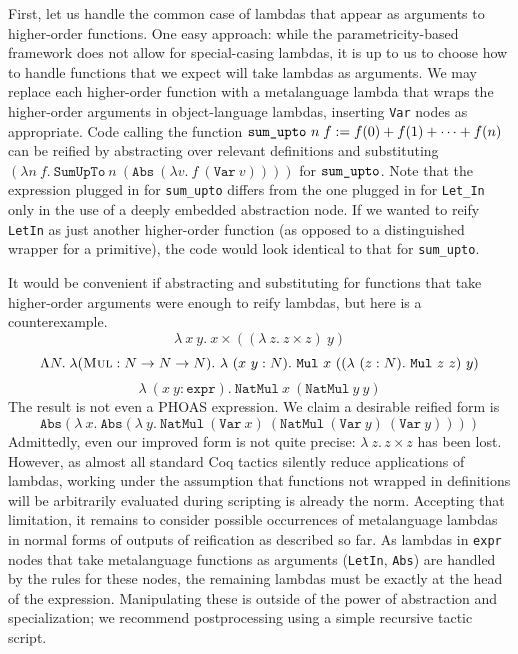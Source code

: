 First, let us handle the common case of lambdas that appear as arguments to higher-order functions.
One easy approach: while the parametricity-based framework does not allow for special-casing lambdas, it is up to us to choose how to handle functions that we expect will take lambdas as arguments.
We may replace each higher-order function with a metalanguage lambda that wraps the higher-order arguments in object-language lambdas, inserting \texttt{Var} nodes as appropriate.
Code calling the function $\text{\texttt{sum\_upto} }n\; f := f(0) + f(1) + \cdots + f(n)$ can be reified by abstracting over relevant definitions and substituting
$(\lambda n\ f.\ \texttt{SumUpTo}\ n\ (\texttt{Abs}\ (\lambda v.\ f\ (\texttt{Var}\ v))))$ for $\text{\texttt{sum\_upto}}$.
Note that the expression plugged in for \texttt{sum\_upto} differs from the one plugged in for \texttt{Let\_In} only in the use of a deeply embedded abstraction node.
If we wanted to reify \texttt{LetIn} as just another higher-order function (as opposed to a distinguished wrapper for a primitive), the code would look identical to that for \texttt{sum\_upto}.

It would be convenient if abstracting and substituting for functions that take higher-order arguments were enough to reify lambdas, but here is a counterexample.
\[
  \lambda\ x\ y.\ x \times ((\lambda\ z.\ z \times z)\ y)
\]
\[
  \Lambda N. \; \lambda (\textsc{Mul} : N \to N \to N).\ \lambda\ (x\ y : N).\ \texttt{Mul}\ x\ ((\lambda\ (z : N).\ \texttt{Mul}\ z\  z)\ y)
\]
\[
  \lambda\ (x\ y : \texttt{expr}).\ \texttt{NatMul}\ x\ (\texttt{NatMul}\ y\  y)
\]
The result is not even a PHOAS expression. We claim a desirable reified form is
\[
  \texttt{Abs}(\lambda\ x.\ \texttt{Abs}(\lambda\ y.\ \texttt{NatMul}\ (\texttt{Var}\ x)\ (\texttt{NatMul}\ (\texttt{Var}\ y)\  (\texttt{Var}\ y))))
\]
Admittedly, even our improved form is not quite precise: $\lambda\ z.\, z \times z$ has been lost. However, as almost all standard Coq tactics silently reduce applications of lambdas, working under the assumption that functions not wrapped in definitions will be arbitrarily evaluated during scripting is already the norm.
Accepting that limitation, it remains to consider possible occurrences of metalanguage lambdas in normal forms of outputs of reification as described so far.
As lambdas in \texttt{expr} nodes that take metalanguage functions as arguments (\texttt{LetIn}, \texttt{Abs}) are handled by the rules for these nodes, the remaining lambdas must be exactly at the head of the expression.
Manipulating these is outside of the power of abstraction and specialization; we recommend postprocessing using a simple recursive tactic script.

